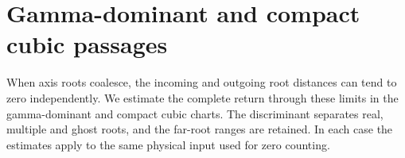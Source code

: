 \section{Gamma-dominant and compact cubic passages}
\label{sec:gamma-cubic-passages}

When axis roots coalesce, the incoming and outgoing root distances can
tend to zero independently. We estimate the complete return
through these limits in the gamma-dominant and compact cubic charts.
The discriminant separates real, multiple and ghost roots, and the
far-root ranges are retained. In each case the estimates apply to the
same physical input used for zero counting.

